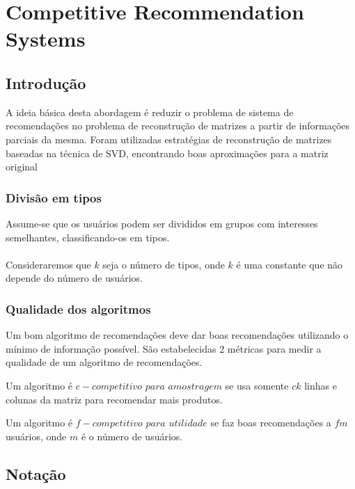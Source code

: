 \documentclass[a4paper,10pt]{article}
\begin{document}
\section{Competitive Recommendation Systems}\label{competitive}

\subsection{Introdução}

A ideia básica desta abordagem é reduzir o problema de sistema de recomendações
no problema de reconstrução de matrizes a partir de informações parciais da mesma. 
Foram utilizadas estratégias de reconstrução de matrizes
baseadas na técnica de SVD, encontrando boas aproximações
para a matriz original 

\subsubsection{Divisão em tipos}
Assume-se que os usuários podem ser divididos em grupos com interesses semelhantes,
classificando-os em tipos. \\ \\ 
Consideraremos que $k$ seja o número de tipos, onde $k$ é
uma constante que não depende do número de usuários.

\subsubsection{Qualidade dos algoritmos}

Um bom algoritmo de recomendações deve dar boas recomendações utilizando o mínimo de 
informação possível. São estabelecidas 2 métricas para medir a qualidade de um algoritmo
de recomendações.

\begin{definicao}
 Um algoritmo é $c-competitivo$ $para$ $amostragem$ se usa somente $ck$
linhas e colunas da matriz para recomendar mais produtos.
\end{definicao}

\begin{definicao}
Um algoritmo é $f-competitivo$ $para$ $utilidade$
se faz boas recomendações a $fm$ usuários, onde $m$ é o número de usuários. 
\end{definicao}

\subsection{Notação}
\end{document}
